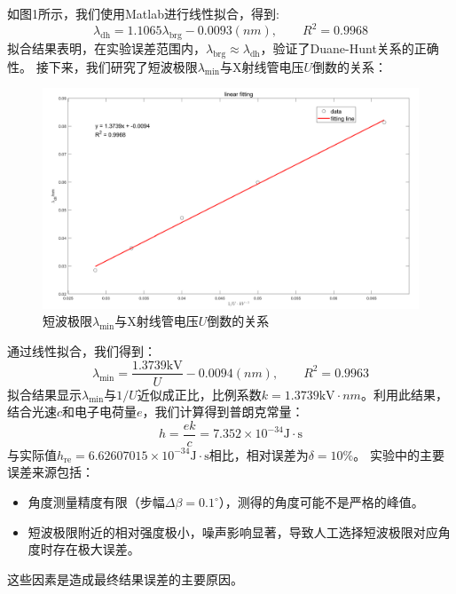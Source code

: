 \documentclass[11pt,a4paper]{article}
\begin{document}
    如图1所示，我们使用Matlab进行线性拟合，得到:
    \begin{equation}\label{eq:fitting_dh}
    \lambda_{\text{dh}}=1.1065\lambda_{\text{brg}}-0.0093(nm),\qquad R^2=0.9968
    \end{equation}
    拟合结果表明，在实验误差范围内，$\lambda_{\text{brg}}\approx\lambda_{\text{dh}}$，验证了Duane-Hunt关系的正确性。
    接下来，我们研究了短波极限$\lambda_{\min}$与X射线管电压$U$倒数的关系：
    \begin{figure}[H]
    \centering
    \includegraphics[scale=0.45]{lu.png}
    \captionsetup{font=footnotesize}
    \caption{短波极限$\lambda_{\min}$与X射线管电压$U$倒数的关系}
    \end{figure}
    通过线性拟合，我们得到：
    \begin{equation}
    \lambda_{\min}=\dfrac{1.3739\text{kV}}{U}-0.0094 (nm),\qquad R^2=0.9963
    \end{equation}
    拟合结果显示$\lambda_{\min}$与$1/U$近似成正比，比例系数$k=1.3739\text{kV}\cdot nm$。利用此结果，结合光速$c$和电子电荷量$e$，我们计算得到普朗克常量：
    \begin{equation}
    h=\dfrac{ek}{c}=7.352\times10^{-34}\text{J}\cdot\text{s}
    \end{equation}
    与实际值$h_{\text{re}}=6.62607015\times10^{-34}\text{J}\cdot\text{s}$相比，相对误差为$\delta=10\%$。
    实验中的主要误差来源包括：
    \begin{itemize}
    \item 角度测量精度有限（步幅$\Delta\beta=0.1^\circ$），测得的角度可能不是严格的峰值。
    \item 短波极限附近的相对强度极小，噪声影响显著，导致人工选择短波极限对应角度时存在极大误差。
    \end{itemize}
    这些因素是造成最终结果误差的主要原因。
    
\end{document}
